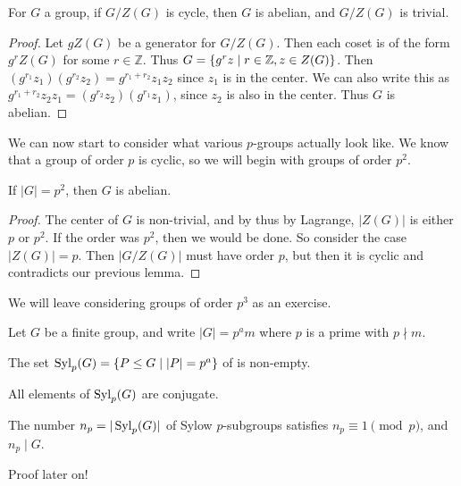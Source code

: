 \documentclass[a4paper]{scrartcl}
\begin{document}
\begin{lemma}
	For $G$ a group, if $G/Z(G)$ is cycle, then $G$ is abelian, and $G/Z(G)$ is trivial.
\end{lemma}
\begin{proof}
	Let $gZ(G)$ be a generator for $G/Z(G)$. Then each coset is of the form $g^r Z(G)$ for some $r \in \mathbb{Z}$. Thus $G = \{g^r z \mid r \in \mathbb{Z}, z \in Z(G) \}$.
	Then $(g^{r_1} z_1)(g^{r_2}z_2) = g^{r_1 + r_2} z_1 z_2$ since $z_1$ is in the center.
	We can also write this as $g^{r_1 + r_2}z_2 z_1 =  (g^{r_2} z_2)(g^{r_1} z_1)$, since $z_2$ is also in the center. Thus $G$ is abelian.
\end{proof}

We can now start to consider what various $p$-groups actually look like. We know that a group of order $p$ is cyclic, so we will begin with groups of order $p^2$.

\begin{corollary}
	If $|G| = p^2$, then $G$ is abelian.
\end{corollary}
\begin{proof}
	The center of $G$ is non-trivial, and by thus by Lagrange, $|Z(G)|$ is either $p$ or $p^2$. If the order was $p^2$, then we would be done. So consider the case $|Z(G)| = p$. Then $|G/Z(G)|$ must have order $p$, but then it is cyclic and contradicts our previous lemma.
\end{proof}

We will leave considering groups of order $p^3$ as an exercise.


Let $G$ be a finite group, and write $|G| = p^a m$ where $p$ is a prime with $p \nmid m$.

\begin{theorem}
	The set $\operatorname{Syl}_p(G) = \{P \leq G \mid |P| = p^a \}$ of  is non-empty.
\end{theorem}
\begin{theorem}
	All elements of $\operatorname{Syl}_p(G)$ are conjugate.
\end{theorem}

\begin{theorem}
	The number $n_p = |\operatorname{Syl}_p(G)|$ of Sylow $p$-subgroups satisfies $n_p \equiv 1 \pmod{p}$, and $n_p \mid G$. 
\end{theorem}

Proof later on!
\end{document}
